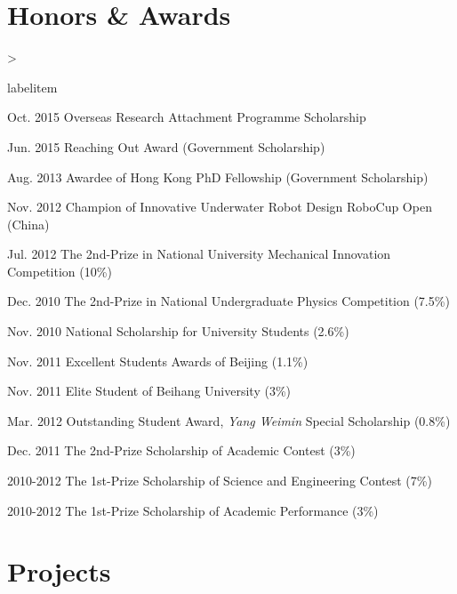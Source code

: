 \documentclass[10pt,letterpaper]{article}
\makeatletter
\newenvironment{dateitemize}%
{\ifnum \@itemdepth >\thr@@\@toodeep\else
\advance\@itemdepth\@ne
\edef\@itemitem{labelitem\romannumeral\the\@itemdepth}%
\expandafter
\list
\csname\@itemitem\endcsname
{\advance\rightmargin3cm
\def\makelabel##1{\hss\llap{\textbullet}\rlap{\hbox to \dimexpr\linewidth+\rightmargin+\itemsep\relax{\hss##1}}}}%
\fi}
{\endlist}%
\makeatother
\begin{document}
    \section*{Honors \& Awards}

    \begin{dateitemize}
        \item[Oct. 2015] Overseas Research Attachment Programme Scholarship
        \item[Jun. 2015] Reaching Out Award (Government Scholarship)
        \item[Aug. 2013] Awardee of Hong Kong PhD Fellowship (Government Scholarship)
        \item[Nov. 2012] Champion of Innovative Underwater Robot Design RoboCup Open (China)
        \item[Jul. 2012] The 2nd-Prize in National University Mechanical Innovation Competition (10\%)
        \item[Dec. 2010] The 2nd-Prize in National Undergraduate Physics Competition (7.5\%)
        \item[Nov. 2010] National Scholarship for University Students (2.6\%)
        \item[Nov. 2011] Excellent Students Awards of Beijing (1.1\%)
        \item[Nov. 2011] Elite Student of Beihang University (3\%)
        \item[Mar. 2012] Outstanding Student Award, \textit{Yang Weimin} Special Scholarship (0.8\%)
        \item[Dec. 2011] The 2nd-Prize Scholarship of Academic Contest (3\%)
        \item[2010-2012] The 1st-Prize Scholarship of Science and Engineering Contest (7\%)
        \item[2010-2012] The 1st-Prize Scholarship of Academic Performance (3\%)

    \end{dateitemize}

    \section*{Projects}
\end{document}
